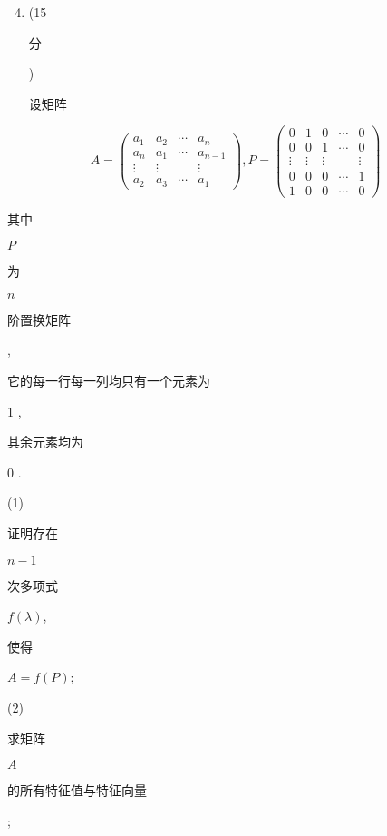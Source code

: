 \documentclass[10pt]{article}
\begin{document}
\begin{enumerate}
  \setcounter{enumi}{3}
  \item (15 \begin{CJK}{UTF8}{mj}分\end{CJK}) \begin{CJK}{UTF8}{mj}设矩阵\end{CJK}
\end{enumerate}
$$
A=\left(\begin{array}{cccc}
a_{1} & a_{2} & \cdots & a_{n} \\
a_{n} & a_{1} & \cdots & a_{n-1} \\
\vdots & \vdots & & \vdots \\
a_{2} & a_{3} & \cdots & a_{1}
\end{array}\right), P=\left(\begin{array}{ccccc}
0 & 1 & 0 & \cdots & 0 \\
0 & 0 & 1 & \cdots & 0 \\
\vdots & \vdots & \vdots & & \vdots \\
0 & 0 & 0 & \cdots & 1 \\
1 & 0 & 0 & \cdots & 0
\end{array}\right)
$$
\begin{CJK}{UTF8}{mj}其中\end{CJK} $P$ \begin{CJK}{UTF8}{mj}为\end{CJK} $n$ \begin{CJK}{UTF8}{mj}阶置换矩阵\end{CJK}, \begin{CJK}{UTF8}{mj}它的每一行每一列均只有一个元素为\end{CJK} 1 , \begin{CJK}{UTF8}{mj}其余元素均为\end{CJK} 0 .

(1) \begin{CJK}{UTF8}{mj}证明存在\end{CJK} $n-1$ \begin{CJK}{UTF8}{mj}次多项式\end{CJK} $f(\lambda)$, \begin{CJK}{UTF8}{mj}使得\end{CJK} $A=f(P)$;

(2) \begin{CJK}{UTF8}{mj}求矩阵\end{CJK} $A$ \begin{CJK}{UTF8}{mj}的所有特征值与特征向量\end{CJK};
\end{document}

